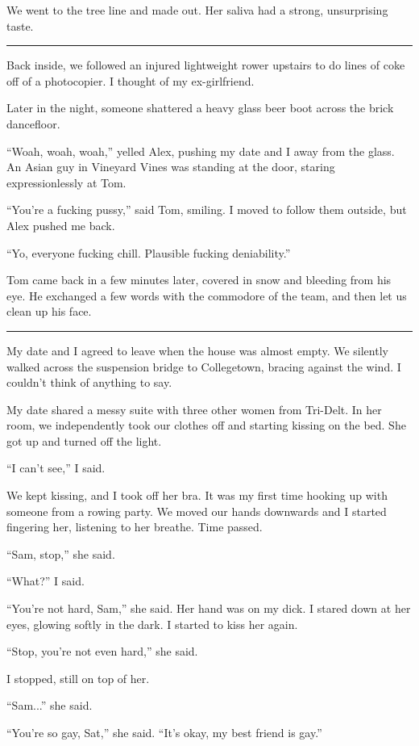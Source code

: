 We went to the tree line and made out.  Her saliva had a strong, unsurprising
taste.

\plainfancybreak{12pt}{2}{}

Back inside, we followed an injured lightweight rower upstairs to do lines of
coke off of a photocopier.  I thought of my ex-girlfriend.

Later in the night, someone shattered a heavy glass beer boot across the brick
dancefloor.

``Woah, woah, woah,'' yelled Alex, pushing my date and I away from the glass.
An Asian guy in Vineyard Vines was standing at the door, staring
expressionlessly at Tom.

``You're a fucking pussy,'' said Tom, smiling.  I moved to follow them outside,
but Alex pushed me back.

``Yo, everyone fucking chill. Plausible fucking deniability.''

Tom came back in a few minutes later, covered in snow and bleeding from his eye.
He exchanged a few words with the commodore of the team, and then let us clean
up his face.

\plainfancybreak{12pt}{2}{}

My date and I agreed to leave when the house was almost empty.  We silently
walked across the suspension bridge to Collegetown, bracing against the wind.  I
couldn't think of anything to say.

My date shared a messy suite with three other women from Tri-Delt.  In her room, we
independently took our clothes off and starting kissing on the bed.  She got up
and turned off the light.

``I can't see,'' I said.

We kept kissing, and I took off her bra.  It was my first time hooking up with
someone from a rowing party.  We moved our hands downwards and I started
fingering her, listening to her breathe.  Time passed.

``Sam, stop,'' she said.

``What?'' I said.

``You're not hard, Sam,'' she said.  Her hand was on my dick.  I stared down at
her eyes, glowing softly in the dark.  I started to kiss her again.

``Stop, you're not even hard,'' she said.

I stopped, still on top of her.

``Sam...'' she said.

``You're so gay, Sat,'' she said.  ``It's okay, my best friend is gay.''

